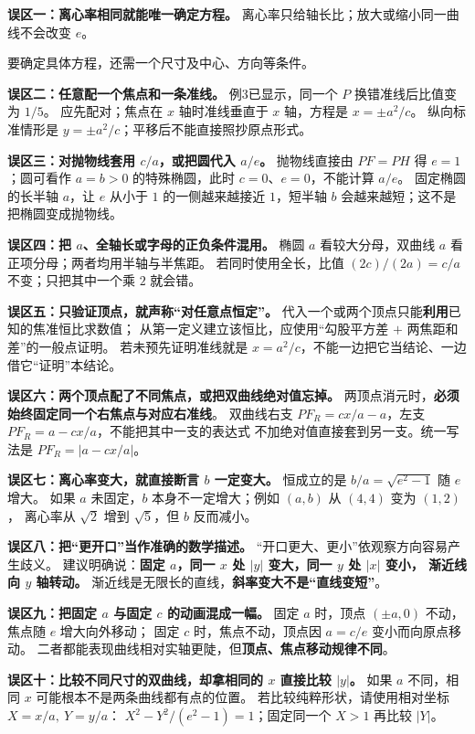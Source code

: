 \begin{trapbox}
\textbf{误区一：离心率相同就能唯一确定方程。}
离心率只给轴长比；放大或缩小同一曲线不会改变 $e$。

要确定具体方程，还需一个尺寸及中心、方向等条件。

\medskip
\textbf{误区二：任意配一个焦点和一条准线。}
例3已显示，同一个 $P$ 换错准线后比值变为 $1/5$。
应先配对；焦点在 $x$ 轴时准线垂直于 $x$ 轴，方程是 $x=\pm a^2/c$。
纵向标准情形是 $y=\pm a^2/c$；平移后不能直接照抄原点形式。

\medskip
\textbf{误区三：对抛物线套用 $c/a$，或把圆代入 $a/e$。}
抛物线直接由 $PF=PH$ 得 $e=1$；圆可看作 $a=b>0$ 的特殊椭圆，此时 $c=0$、$e=0$，不能计算 $a/e$。
固定椭圆的长半轴 $a$，让 $e$ 从小于 $1$ 的一侧越来越接近 $1$，短半轴 $b$ 会越来越短；这不是把椭圆变成抛物线。

\medskip
\textbf{误区四：把 $a$、全轴长或字母的正负条件混用。}
椭圆 $a$ 看较大分母，双曲线 $a$ 看正项分母；两者均用半轴与半焦距。
若同时使用全长，比值 $(2c)/(2a)=c/a$ 不变；只把其中一个乘 $2$ 就会错。


\medskip
\textbf{误区五：只验证顶点，就声称“对任意点恒定”。}
代入一个或两个顶点只能\textbf{利用}已知的焦准恒比求数值；
从第一定义建立该恒比，应使用“勾股平方差 $+$ 两焦距和差”的一般点证明。
若未预先证明准线就是 $x=a^2/c$，不能一边把它当结论、一边借它“证明”本结论。

\medskip
\textbf{误区六：两个顶点配了不同焦点，或把双曲线绝对值忘掉。}
两顶点消元时，\textbf{必须始终固定同一个右焦点与对应右准线}。
双曲线右支 $PF_R=cx/a-a$，左支 $PF_R=a-cx/a$，不能把其中一支的表达式
不加绝对值直接套到另一支。统一写法是 $PF_R=|a-cx/a|$。


\medskip
\textbf{误区七：离心率变大，就直接断言 $b$ 一定变大。}
恒成立的是 $\displaystyle b/a=\sqrt{e^2-1}$ 随 $e$ 增大。
如果 $a$ 未固定，$b$ 本身不一定增大；例如 $(a,b)$ 从 $(4,4)$ 变为 $(1,2)$，
离心率从 $\sqrt2$ 增到 $\sqrt5$，但 $b$ 反而减小。

\medskip
\textbf{误区八：把“更开口”当作准确的数学描述。}
“开口更大、更小”依观察方向容易产生歧义。
建议明确说：\textbf{固定 $a$，同一 $x$ 处 $|y|$ 变大，同一 $y$ 处 $|x|$ 变小，
渐近线向 $y$ 轴转动。}
渐近线是无限长的直线，\textbf{斜率变大不是“直线变短”}。

\medskip
\textbf{误区九：把固定 $a$ 与固定 $c$ 的动画混成一幅。}
固定 $a$ 时，顶点 $(\pm a,0)$ 不动，焦点随 $e$ 增大向外移动；
固定 $c$ 时，焦点不动，顶点因 $a=c/e$ 变小而向原点移动。
二者都能表现曲线相对实轴更陡，但\textbf{顶点、焦点移动规律不同}。

\medskip
\textbf{误区十：比较不同尺寸的双曲线，却拿相同的 $x$ 直接比较 $|y|$。}
如果 $a$ 不同，相同 $x$ 可能根本不是两条曲线都有点的位置。
若比较纯粹形状，请使用相对坐标 $X=x/a,\ Y=y/a$：
$X^2-Y^2/(e^2-1)=1$；固定同一个 $X>1$ 再比较 $|Y|$。


\end{trapbox}
